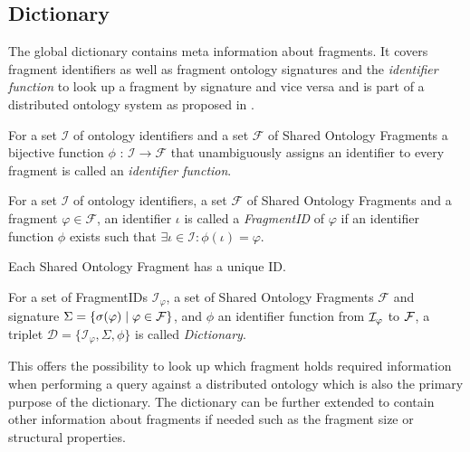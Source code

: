 \subsection{Dictionary}
\label{dictionary}
The global dictionary contains meta information about fragments.
It covers fragment identifiers as well as fragment ontology signatures
and the \emph{identifier function} to look up a fragment by signature
and vice versa and is part of a distributed ontology system as proposed
in \cite{chen09}.
\begin{definition}
For a set $\mathcal{I}$ of ontology identifiers
and a set $\mathcal{F}$ of Shared Ontology Fragments
a bijective function $\phi$ : $\mathcal{I} \to \mathcal{F}$ that unambiguously assigns an identifier to every fragment is called an \emph{identifier function}.

\end{definition}
\begin{definition}[FragmentID]
For a set $\mathcal{I}$ of ontology identifiers,  a set $\mathcal{F}$ of Shared Ontology Fragments and a fragment $\varphi \in \mathcal{F}$, an identifier $\iota$ is called a \emph{FragmentID} of $\varphi$ if an identifier function $\phi$ exists such that $\exists \iota \in \mathcal{I} : \phi(\iota) = \varphi$. 
\end{definition}
Each Shared Ontology Fragment has a unique ID.
\begin{definition}[Dictionary]

For a set of FragmentIDs $\mathcal{I}_\varphi$, a set of Shared Ontology Fragments $\mathcal{F}$ and signature $\Sigma = \{{\sigma(\varphi)}\mid\varphi\in{\cal F}\}
$,
and $\phi$ an identifier function from ${\cal I}_\varphi$ to $\cal F$,
a triplet $\mathcal{D} = \{\mathcal{I}_\varphi, \Sigma, \phi \}$ is called
\emph{Dictionary}.

\end{definition}
This offers the possibility to look up which fragment holds required information
when performing a query against a distributed ontology which is also
the primary purpose of the dictionary.
The dictionary can be further extended to contain other information about fragments
if needed such as the fragment size or structural properties.

